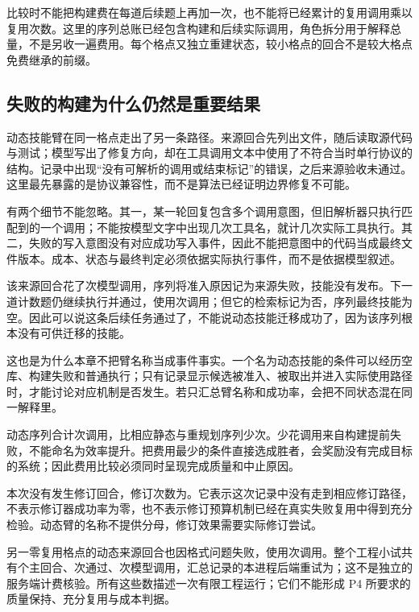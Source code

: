 比较时不能把构建费在每道后续题上再加一次，也不能将已经累计的复用调用乘以复用次数。这里的序列总账已经包含构建和后续实际调用，角色拆分用于解释总量，不是另收一遍费用。每个格点又独立重建状态，较小格点的回合不是较大格点免费继承的前缀。

\subsection{失败的构建为什么仍然是重要结果}
\label{sec:ch15-rejectedbuild}

动态技能臂在同一格点走出了另一条路径。来源回合先列出文件，随后读取源代码与测试；模型写出了修复方向，却在工具调用文本中使用了不符合当时单行协议的结构。记录中出现“没有可解析的调用或结束标记”的错误，之后来源验收未通过。这里最先暴露的是协议兼容性，而不是算法已经证明边界修复不可能。

有两个细节不能忽略。其一，某一轮回复包含多个调用意图，但旧解析器只执行匹配到的一个调用；不能按模型文字中出现几次工具名，就计几次实际工具执行。其二，失败的写入意图没有对应成功写入事件，因此不能把意图中的代码当成最终文件版本。成本、状态与最终判定必须依据实际执行事件，而不是依据模型叙述。

该来源回合花了次模型调用，序列将准入原因记为来源失败，技能没有发布。下一道计数题仍继续执行并通过，使用次调用；但它的检索标记为否，序列最终技能为空。因此可以说这条后续任务通过了，不能说动态技能迁移成功了，因为该序列根本没有可供迁移的技能。

这也是为什么本章不把臂名称当成事件事实。一个名为动态技能的条件可以经历空库、构建失败和普通执行；只有记录显示候选被准入、被取出并进入实际使用路径时，才能讨论对应机制是否发生。若只汇总臂名称和成功率，会把不同状态混在同一解释里。

动态序列合计次调用，比相应静态与重规划序列少次。少花调用来自构建提前失败，不能命名为效率提升。把费用最少的条件直接选成胜者，会奖励没有完成目标的系统；因此费用比较必须同时呈现完成质量和中止原因。

本次没有发生修订回合，修订次数为。它表示这次记录中没有走到相应修订路径，不表示修订器成功率为零，也不表示修订预算机制已经在真实失败复用中得到充分检验。动态臂的名称不提供分母，修订效果需要实际修订尝试。

另一零复用格点的动态来源回合也因格式问题失败，使用次调用。整个工程小试共有个主回合、次通过、次模型调用，汇总记录的本进程后端重试为；这不是独立的服务端计费核验。所有这些数描述一次有限工程运行；它们不能形成 P4 所要求的质量保持、充分复用与成本判据。

